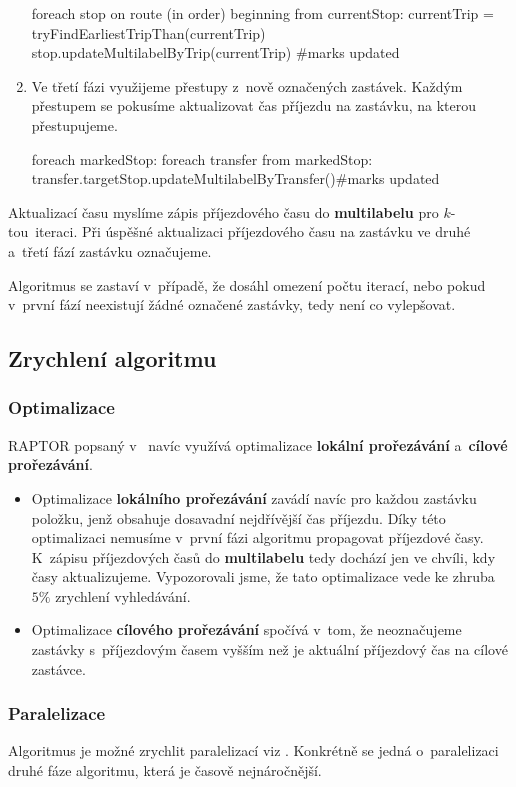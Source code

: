 \begin{enumerate}
\begin{code}
    foreach stop on route (in order) beginning from currentStop:
      currentTrip = tryFindEarliestTripThan(currentTrip)
      stop.updateMultilabelByTrip(currentTrip) #marks updated
    \end{code}

    \item Ve třetí fázi využijeme přestupy z~nově označených zastávek. Každým přestupem se pokusíme aktualizovat čas příjezdu na zastávku, na kterou přestupujeme.
    
    \begin{code}
foreach markedStop:
  foreach transfer from markedStop:
    transfer.targetStop.updateMultilabelByTransfer()#marks updated
    \end{code}
\end{enumerate}

Aktualizací času myslíme zápis příjezdového času do \textbf{multilabelu} pro $k$-tou~iteraci. Při úspěšné aktualizaci příjezdového času na zastávku ve druhé a~třetí fází zastávku označujeme.

Algoritmus se zastaví v~případě, že dosáhl omezení počtu iterací, nebo pokud v~první fází neexistují žádné označené zastávky, tedy není co vylepšovat.


\subsection{Zrychlení algoritmu}

\subsubsection{Optimalizace}\label{raptor-optimalizace}

RAPTOR popsaný v~\citet{raptor} navíc využívá optimalizace \textbf{lokální prořezávání} a~\textbf{cílové prořezávání}.

\begin{itemize}
    \item Optimalizace \textbf{lokálního prořezávání} zavádí navíc pro každou zastávku položku, jenž obsahuje dosavadní nejdřívější čas příjezdu. Díky této optimalizaci nemusíme v~první fázi algoritmu propagovat příjezdové časy. K~zápisu příjezdových časů do \textbf{multilabelu} tedy dochází jen ve chvíli, kdy časy aktualizujeme. Vypozorovali jsme, že tato optimalizace vede ke zhruba $5\%$ zrychlení vyhledávání.
    
    \item Optimalizace \textbf{cílového prořezávání} spočívá v~tom, že neoznačujeme zastávky s~příjezdovým časem vyšším než je aktuální příjezdový čas na cílové zastávce.
\end{itemize}

\subsubsection{Paralelizace}\label{raptor-paralelizace}

Algoritmus je možné zrychlit paralelizací viz \citet[Sekce 3.3]{raptor}. Konkrétně se jedná o~paralelizaci druhé fáze algoritmu, která je časově nejnáročnější.